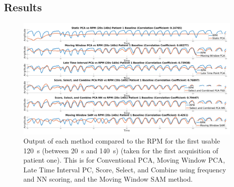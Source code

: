         \subsection{Results} \label{sec:pca_data_driven_surrogate_signal_extraction_methods_for_dynamic_pet_results}
            \begin{figure}
                \centering
                
                \includegraphics[width=1.0\linewidth]{figures/data_driven_surrogate_signal_extraction_methods_1_patient_one_output.png}
                
                \captionsetup{singlelinecheck=false}
                \caption{
                    Output of each method compared to the \gls{RPM} for the first usable \SI{120}{\second} (between \SI{20}{\second} and \SI{140}{\second}) (taken for the first acquisition of patient one). This is for Conventional \gls{PCA}, Moving Window \gls{PCA}, Late Time Interval \gls{PC}, Score, Select, and Combine using frequency and \gls{NN} scoring, and the Moving Window \gls{SAM} method.
                }
                \label{fig:patient_one_output}
            \end{figure}
            
